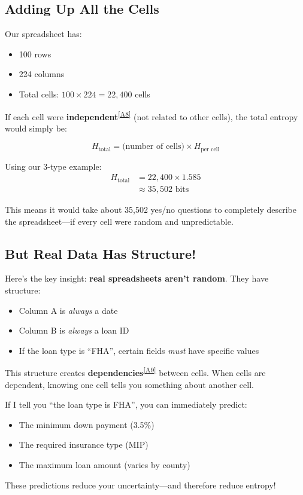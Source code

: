 \documentclass[11pt,a4paper]{article}
\newcommand{\term}[2]{\textcolor{termcolor}{\textbf{#1}}\textsuperscript{\hyperref[#2]{[#2]}}}
\begin{document}
\subsection{Adding Up All the Cells}

Our spreadsheet has:
\begin{itemize}
    \item 100 rows
    \item 224 columns
    \item Total cells: $100 \times 224 = 22,400$ cells
\end{itemize}

If each cell were \term{independent}{A8} (not related to other cells), the total entropy would simply be:

\begin{equation}
H_{\text{total}} = \text{(number of cells)} \times H_{\text{per cell}}
\end{equation}

Using our 3-type example:
\begin{align}
H_{\text{total}} &= 22,400 \times 1.585 \\
&\approx 35,502 \text{ bits}
\end{align}

This means it would take about 35,502 yes/no questions to completely describe the spreadsheet---if every cell were random and unpredictable.

\subsection{But Real Data Has Structure!}

Here's the key insight: \textbf{real spreadsheets aren't random}. They have structure:

\begin{itemize}
    \item Column A is \textit{always} a date
    \item Column B is \textit{always} a loan ID
    \item If the loan type is ``FHA'', certain fields \textit{must} have specific values
\end{itemize}

This structure creates \term{dependencies}{A9} between cells. When cells are dependent, knowing one cell tells you something about another cell.

\begin{infobox}
If I tell you ``the loan type is FHA'', you can immediately predict:
\begin{itemize}
    \item The minimum down payment (3.5\%)
    \item The required insurance type (MIP)
    \item The maximum loan amount (varies by county)
\end{itemize}
These predictions reduce your uncertainty---and therefore reduce entropy!
\end{infobox}
\end{document}

